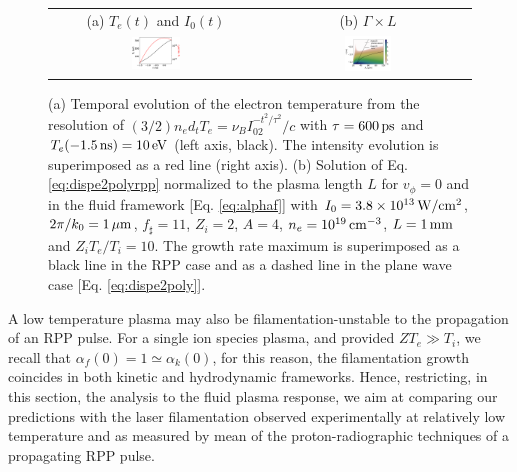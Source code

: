 \documentclass[
 reprint,
 amsmath,amssymb,
 aps,
]{revtex4-1}
\def\tc{\textcolor{red}}
\begin{document}
\begin{figure}
\begin{tabular}{cc}
(a) $T_e(t)$ and $I_0(t)$&
(b) $\Gamma \times L$  \\
\includegraphics[width=0.24\textwidth]{xpFuchs_te.eps}& 
\includegraphics[width=0.24\textwidth]{xpFuchs.png}
\end{tabular}
\caption{ \label{fig:xpfuchs_th}  
(a) Temporal evolution of the electron temperature 
from the resolution of $(3/2)n_e d_tT_e=\nu_BI_02^{-t^2/\tau^2}/c$ with $\tau = 600\,\rm ps$  and $T_e(-1.5 \, \rm{ns})=10\,\rm eV$ (left axis, black).
The intensity evolution is superimposed as a red line (right axis).
(b) Solution of Eq. \eqref{eq:dispe2polyrpp} normalized to the plasma length  $L$  for $v_\phi=0$ and in the fluid framework [Eq. \eqref{eq:alphaf}] with $I_0=3.8\times 10^{13}\, \rm W/cm^2$, $2\pi/k_0=1\,\rm\mu m$, $f_\sharp=11$, $Z_i=2$, $A=4$, $n_e=10^{19} \,\rm cm^{-3}$,  $L=1\,\rm mm$ and  $Z_iT_e/T_i=10$. 
The growth rate maximum is superimposed as a  black line in the RPP case and as a dashed line in the plane wave case [Eq. \eqref{eq:dispe2poly}].
 }
\end{figure}


A low temperature plasma may also be filamentation-unstable to the  propagation of an RPP pulse.
For a single ion species plasma, and provided $ZT_e\gg T_i$,   we recall that $\alpha_f(0)=1\simeq \alpha_k(0)$, for this reason, the filamentation growth coincides in both  kinetic and hydrodynamic frameworks. 
Hence, restricting, in this section, the analysis to the fluid plasma response, we aim at comparing our predictions with the laser filamentation observed experimentally at relatively low temperature and as measured by mean of the proton-radiographic techniques of a propagating RPP pulse.
\end{document}
